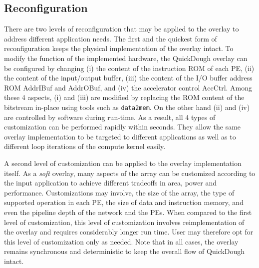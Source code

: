 \subsection{Reconfiguration}
There are two levels of reconfiguration that may be applied to the overlay to address different application needs.  The first and the quickest form of reconfiguration keeps the physical implementation of the overlay intact.
To modify the function of the implemented hardware, the QuickDough overlay can be configured by changing (i) the content of the instruction ROM of each PE, (ii) the content of the input/output buffer,  (iii) the content of the I/O buffer address ROM AddrIBuf and AddrOBuf, and (iv) the accelerator control AccCtrl.  Among these 4 aspects, (i) and (iii) are modified by replacing the ROM content of the bitstream in-place using tools such as \texttt{data2mem}.  On the other hand (ii) and (iv) are controlled by software during run-time.  As a result, all 4 types of customization can be performed rapidly within seconds.  They allow the same overlay implementation to be targeted to different applications as well as to different loop iterations of the compute kernel easily.

A second level of customization can be applied to the overlay implementation itself.
As a \emph{soft} overlay, many aspects of the array can be customized according to the input application to achieve different tradeoffs in area, power and performance.  Customizations may involve, the size of the array, the type of supported operation in each PE, the size of data and instruction memory, and even the pipeline depth of the network and the PEs.  
When compared to the first level of customization, this level of customization involves reimplementation of the overlay and requires considerably longer run time.
User may therefore opt for this level of customization only as needed.
Note that in all cases, the overlay remains synchronous and deterministic to keep the overall flow of QuickDough intact.



